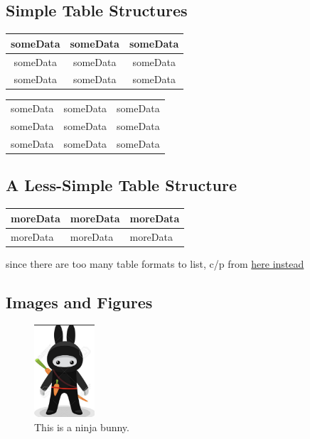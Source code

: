 \documentclass[12pt,twoside,a4paper]{article}
\begin{document}
\subsection*{Simple Table Structures}

\begin{tabular}{ c |c| c }
 someData & someData & someData \\
 \hline
 someData & someData & someData \\
 someData & someData & someData
\end{tabular}

\begin{tabular}{ |c|c|c| }
\hline
 someData & someData & someData \\
 someData & someData & someData \\
 someData & someData & someData \\
\hline
\end{tabular}

\subsection*{A Less-Simple Table Structure}
\begin{tabularx}{0.8\textwidth} {
  | >{\raggedright\arraybackslash}X
  | >{\centering\arraybackslash}X
  | >{\raggedleft\arraybackslash}X | }
 \hline
 moreData & moreData & moreData \\
 \hline
 moreData & moreData & moreData \\
\hline
\end{tabularx}
\newline since there are too many table formats to list, c/p from \href{https://www.overleaf.com/learn/latex/tables}{here instead}

\newpage
\subsection*{Images and Figures}

\begin{figure}[htbp]
  \centering
  \includegraphics[width=0.2\textwidth]{ninjaBunny.jpg}
  \caption{This is a ninja bunny.}
\end{figure}
\end{document}
